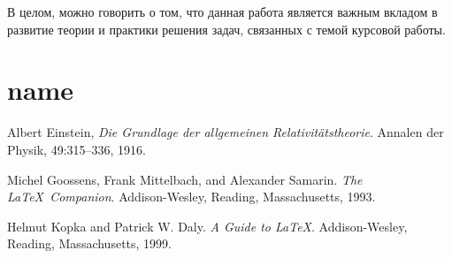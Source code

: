 \documentclass[draft]{article}
\begin{document}
В целом, можно говорить о том, что данная работа является важным вкладом в развитие теории и практики решения задач, связанных с темой курсовой работы.\newpage\section{name}
\begin{thebibliography}{9}

  Albert Einstein,
  \textit{Die Grundlage der allgemeinen Relativitätstheorie}.
  Annalen der Physik, 49:315–336, 1916.

Michel Goossens, Frank Mittelbach, and Alexander Samarin. 
\textit{The \LaTeX\ Companion}. 
Addison-Wesley, Reading, Massachusetts, 1993.

Helmut Kopka and Patrick W. Daly. 
\textit{A Guide to \LaTeX}. 
Addison-Wesley, Reading, Massachusetts, 1999.

\end{thebibliography}
\end{document}
